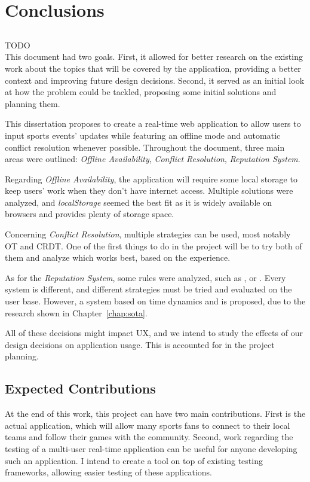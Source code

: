 \chapter{Conclusions} \label{chap:concl}

\section*{}

{\Huge TODO} \\

This document had two goals. First, it allowed for better research on the existing work about the topics that will be covered by the application, providing a better context and improving future design decisions. Second, it served as an initial look at how the problem could be tackled, proposing some initial solutions and planning them.

This dissertation proposes to create a real-time web application to allow users to input sports events' updates while featuring an offline mode and automatic conflict resolution whenever possible. Throughout the document, three main areas were outlined: \textit{Offline Availability}, \textit{Conflict Resolution}, \textit{Reputation System}. 

Regarding \textit{Offline Availability}, the application will require some local storage to keep users' work when they don't have internet access. Multiple solutions were analyzed, and \textit{localStorage} seemed the best fit as it is widely available on browsers and provides plenty of storage space.

Concerning \textit{Conflict Resolution}, multiple strategies can be used, most notably OT and CRDT. One of the first things to do in the project will be to try both of them and analyze which works best, based on the experience.

As for the \textit{Reputation System}, some rules were analyzed, such as , or . Every system is different, and different strategies must be tried and evaluated on the user base. However, a system based on time dynamics and  is proposed, due to the research shown in Chapter~\ref{chap:sota}.

All of these decisions might impact UX, and we intend to study the effects of our design decisions on application usage. This is accounted for in the project planning.

\section{Expected Contributions}
At the end of this work, this project can have two main contributions. First is the actual application, which will allow many sports fans to connect to their local teams and follow their games with the community. Second, work regarding the testing of a multi-user real-time application can be useful for anyone developing such an application. I intend to create a tool on top of existing testing frameworks, allowing easier testing of these applications.

\vspace*{12mm}